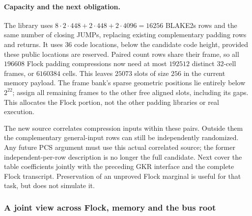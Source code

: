 \paragraph{Capacity and the next obligation.} The library uses $8\cdot2\cdot448+2\cdot448+2\cdot4096=16256$ BLAKE2s rows and the same number of closing JUMPs, replacing existing complementary padding rows and returns. It uses $36$ code locations, below the candidate code height, provided these public locations are reserved. Paired count rows share their frame, so all $196608$ Flock padding compressions now need at most $192512$ distinct $32$-cell frames, or $6160384$ cells. This leaves $25073$ slots of size $256$ in the current memory payload. The frame bank's sparse geometric positions lie entirely below $2^{22}$; assign all remaining frames to the other free aligned slots, including its gaps. This allocates the Flock portion, not the other padding libraries or real execution.

The new source correlates compression inputs within these pairs. Outside them the complementary general-input rows can still be independently randomized. Any future PCS argument must use this actual correlated source; the former independent-per-row description is no longer the full candidate. Next cover the table coefficients jointly with the preceding GKR interface and the complete Flock transcript. Preservation of an unproved Flock marginal is useful for that task, but does not simulate it.

\subsubsection{A joint view across Flock, memory and the bus root}


